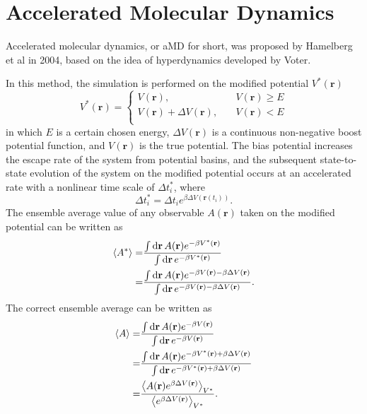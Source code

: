 \section{Accelerated Molecular Dynamics\label{Sec:ES:aMD}}
Accelerated molecular dynamics, or aMD for short, was proposed by Hamelberg et al in 2004,\cite{HamelbergJCP2004} based on the idea of hyperdynamics developed by Voter\cite{VoterPRL1997}.

In this method, the simulation is performed on the modified potential $V^\ast(\mathbf{r})$
\begin{equation}
	V^\ast(\mathbf{r})= 
	\left\{ 
	\begin{array}{rl} 
		V(\mathbf{r}), &\quad V(\mathbf{r})\geq E\\ 
		V(\mathbf{r})+\Delta V(\mathbf{r}), &\quad V(\mathbf{r})< E\\  
	\end{array} 
	\right.
\end{equation}
in which $E$ is a certain chosen energy, $\Delta V(\mathbf{r})$ is a continuous non-negative boost potential function, and $V(\mathbf{r})$ is the true potential. The bias potential increases the escape rate of the system from potential basins, and the subsequent state-to-state evolution of the system on the modified potential occurs at an accelerated rate with a nonlinear time scale of $\Delta t^\ast_i$, where
\begin{equation}
	\Delta t^\ast_i=\Delta t_i e^{\beta \Delta V(\mathbf{r}(t_i))}.
\end{equation}
The ensemble average value of any observable $A(\mathbf{r})$ taken on the modified potential can be written as
\begin{align}
	\left<A^\ast\right>=&\frac{\int \mathop{}\!\mathrm{d} \mathbf{r}\,A(\mathbf{r})e^{-\beta V^{\ast}(\mathbf{r})}}{\int \mathop{}\!\mathrm{d} \mathbf{r}\, e^{-\beta V^{\ast}(\mathbf{r})}}\notag\\
	        =&\frac{\int \mathop{}\!\mathrm{d} \mathbf{r}\,A(\mathbf{r})e^{-\beta V(\mathbf{r})-\beta \Delta V(\mathbf{r})}}{\int \mathop{}\!\mathrm{d} \mathbf{r}\, e^{-\beta V(\mathbf{r})-\beta \Delta V(\mathbf{r})}}.
\end{align}
The correct ensemble average can be written as
\begin{align}
	\left<A\right>=&\frac{\int \mathop{}\!\mathrm{d} \mathbf{r}\,A(\mathbf{r})e^{-\beta V(\mathbf{r})}}{\int \mathop{}\!\mathrm{d} \mathbf{r}\, e^{-\beta V(\mathbf{r})}}\notag\\
	=&\frac{\int \mathop{}\!\mathrm{d} \mathbf{r}\,A(\mathbf{r})e^{-\beta V^\ast(\mathbf{r})+\beta \Delta V(\mathbf{r})}}{\int \mathop{}\!\mathrm{d} \mathbf{r}\, e^{-\beta V^\ast(\mathbf{r})+\beta \Delta V(\mathbf{r})}}\notag\\
	=&\frac{\left<A(\mathbf{r})e^{\beta \Delta V(\mathbf{r})}\right>_{V^\ast}}{\left<e^{\beta \Delta V(\mathbf{r}) }\right>_{V^\ast}}.
\end{align}
